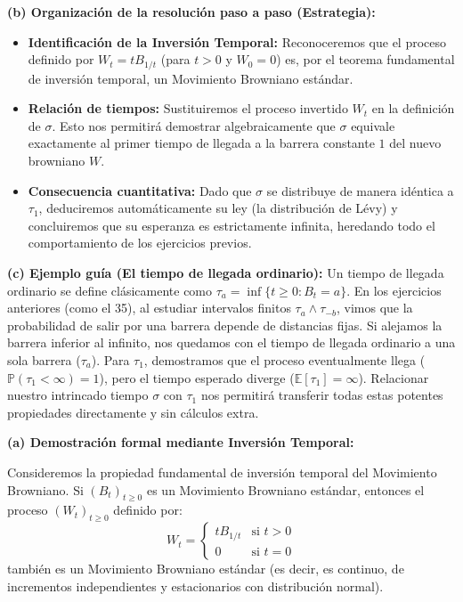 \documentclass[11pt, letterpaper]{article}
\begin{document}
\begin{solucion}
    \textbf{(b) Organización de la resolución paso a paso (Estrategia):}
    \begin{itemize}
        \item[(i)] \textbf{Identificación de la Inversión Temporal:} Reconoceremos que el proceso definido por $W_t = t B_{1/t}$ (para $t > 0$ y $W_0 = 0$) es, por el teorema fundamental de inversión temporal, un Movimiento Browniano estándar.
        \item[(ii)] \textbf{Relación de tiempos:} Sustituiremos el proceso invertido $W_t$ en la definición de $\sigma$. Esto nos permitirá demostrar algebraicamente que $\sigma$ equivale exactamente al primer tiempo de llegada a la barrera constante $1$ del nuevo browniano $W$.
        \item[(iii)] \textbf{Consecuencia cuantitativa:} Dado que $\sigma$ se distribuye de manera idéntica a $\tau_1$, deduciremos automáticamente su ley (la distribución de Lévy) y concluiremos que su esperanza es estrictamente infinita, heredando todo el comportamiento de los ejercicios previos.
    \end{itemize}

    \vspace{3mm}
    \textbf{(c) Ejemplo guía (El tiempo de llegada ordinario):}
    Un tiempo de llegada ordinario se define clásicamente como $\tau_a = \inf\{t \ge 0 : B_t = a\}$.
    En los ejercicios anteriores (como el 35), al estudiar intervalos finitos $\tau_a \wedge \tau_{-b}$, vimos que la probabilidad de salir por una barrera depende de distancias fijas. Si alejamos la barrera inferior al infinito, nos quedamos con el tiempo de llegada ordinario a una sola barrera ($\tau_a$).
    Para $\tau_1$, demostramos que el proceso eventualmente llega ($\mathbb{P}(\tau_1 < \infty) = 1$), pero el tiempo esperado diverge ($\mathbb{E}[\tau_1] = \infty$). Relacionar nuestro intrincado tiempo $\sigma$ con $\tau_1$ nos permitirá transferir todas estas potentes propiedades directamente y sin cálculos extra.

    \vspace{3mm}
    \textbf{(a) Demostración formal mediante Inversión Temporal:}

    Consideremos la propiedad fundamental de inversión temporal del Movimiento Browniano. Si $(B_t)_{t \ge 0}$ es un Movimiento Browniano estándar, entonces el proceso $(W_t)_{t \ge 0}$ definido por:
    \[ W_t = \begin{cases} t B_{1/t} & \text{si } t > 0 \\ 0 & \text{si } t = 0 \end{cases} \]
    también es un Movimiento Browniano estándar (es decir, es continuo, de incrementos independientes y estacionarios con distribución normal).


\end{solucion}
\end{document}
